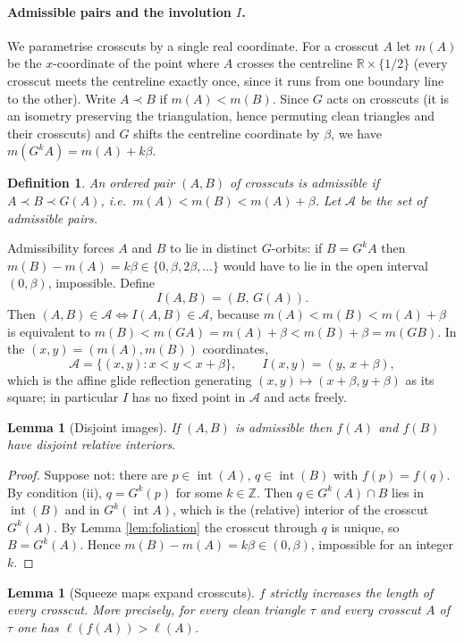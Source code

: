 \documentclass[12pt]{article}
\newtheorem{lemma}[theorem]{Lemma}
\newtheorem{definition}[theorem]{Definition}
\newcommand{\R}{\mathbb{R}}
\newcommand{\Z}{\mathbb{Z}}
\DeclareMathOperator{\interior}{int}
\begin{document}
\paragraph{Admissible pairs and the involution $I$.}
We parametrise crosscuts by a single real coordinate. For a crosscut $A$
let $m(A)$ be the $x$-coordinate of the point where $A$ crosses the
centreline $\R\times\{1/2\}$ (every crosscut meets the centreline
exactly once, since it runs from one boundary line to the other).
Write $A\prec B$ if $m(A)<m(B)$. Since $G$ acts on crosscuts (it is an
isometry preserving the triangulation, hence permuting clean triangles
and their crosscuts) and $G$ shifts the centreline coordinate by $\beta$,
we have $m(G^kA)=m(A)+k\beta$.

\begin{definition}
An ordered pair $(A,B)$ of crosscuts is \emph{admissible} if
$A\prec B\prec G(A)$, i.e.\ $m(A)<m(B)<m(A)+\beta$. Let $\mathcal A$ be
the set of admissible pairs.
\end{definition}

Admissibility forces $A$ and $B$ to lie in distinct $G$-orbits: if
$B=G^kA$ then $m(B)-m(A)=k\beta\in\{0,\beta,2\beta,\dots\}$ would have to
lie in the open interval $(0,\beta)$, impossible. Define
\[
I(A,B)=(B,\,G(A)).
\]
Then $(A,B)\in\mathcal A\iff I(A,B)\in\mathcal A$, because
$m(A)<m(B)<m(A)+\beta$ is equivalent to
$m(B)<m(GA)=m(A)+\beta<m(B)+\beta=m(GB)$. In the $(x,y)=(m(A),m(B))$
coordinates,
\[
\mathcal A=\{(x,y):x<y<x+\beta\},\qquad I(x,y)=(y,\,x+\beta),
\]
which is the affine glide reflection generating
$(x,y)\mapsto(x+\beta,y+\beta)$ as its square; in particular $I$ has no
fixed point in $\mathcal A$ and acts freely.

\begin{lemma}[Disjoint images]\label{lem:adm}
If $(A,B)$ is admissible then $f(A)$ and $f(B)$ have disjoint relative
interiors.
\end{lemma}

\begin{proof}
Suppose not: there are $p\in\interior(A)$, $q\in\interior(B)$ with
$f(p)=f(q)$. By condition (ii), $q=G^k(p)$ for some $k\in\Z$. Then
$q\in G^k(A)\cap B$ lies in $\interior(B)$ and in $G^k(\interior A)$,
which is the (relative) interior of the crosscut $G^k(A)$. By Lemma
\ref{lem:foliation} the crosscut through $q$ is unique, so $B=G^k(A)$.
Hence $m(B)-m(A)=k\beta\in(0,\beta)$, impossible for an integer $k$.
\end{proof}

\begin{lemma}[Squeeze maps expand crosscuts]\label{lem:expand}
$f$ strictly increases the length of every crosscut. More precisely, for
every clean triangle $\tau$ and every crosscut $A$ of $\tau$ one has
$\ell(f(A))>\ell(A)$.
\end{lemma}
\end{document}
